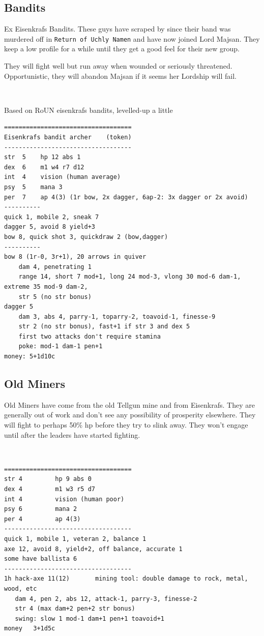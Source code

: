 

\begin{samepage}
\subsection*{Bandits}
Ex Eisenkrafs Bandits. These guys have scraped by since their band was murdered off in \texttt{Return of Uchly Namen} and have now joined Lord Majsan. They keep a low profile for a while until they get a good feel for their new group.

They will fight well but run away when wounded or seriously threatened. Opportunistic, they will abandon Majsan if it seems her Lordship will fail.

\

\noindent
Based on RoUN eisenkrafs bandits, levelled-up a little
\small \begin{verbatim}
===================================
Eisenkrafs bandit archer    (token)
-----------------------------------
str  5    hp 12 abs 1
dex  6    m1 w4 r7 d12
int  4    vision (human average)
psy  5    mana 3
per  7    ap 4(3) (1r bow, 2x dagger, 6ap-2: 3x dagger or 2x avoid)
----------
quick 1, mobile 2, sneak 7
dagger 5, avoid 8 yield+3
bow 8, quick shot 3, quickdraw 2 (bow,dagger)
----------
bow 8 (1r-0, 3r+1), 20 arrows in quiver
    dam 4, penetrating 1
    range 14, short 7 mod+1, long 24 mod-3, vlong 30 mod-6 dam-1, extreme 35 mod-9 dam-2,
    str 5 (no str bonus)
dagger 5
    dam 3, abs 4, parry-1, toparry-2, toavoid-1, finesse-9
    str 2 (no str bonus), fast+1 if str 3 and dex 5
    first two attacks don't require stamina
    poke: mod-1 dam-1 pen+1
money: 5+1d10c
\end{verbatim} \normalsize
\end{samepage}



\begin{samepage}
\subsection*{Old Miners}
Old Miners have come from the old Tellgun mine and from Eisenkrafs. They are generally out of work and don't see any possibility of prosperity elsewhere. They will fight to perhaps 50\% hp before they try to slink away. They won't engage until after the leaders have started fighting.

\

\small \begin{verbatim}
===================================
str 4         hp 9 abs 0
dex 4         m1 w3 r5 d7
int 4         vision (human poor)
psy 6         mana 2
per 4         ap 4(3)
-----------------------------------
quick 1, mobile 1, veteran 2, balance 1
axe 12, avoid 8, yield+2, off balance, accurate 1
some have ballista 6
-----------------------------------
1h hack-axe 11(12)       mining tool: double damage to rock, metal, wood, etc
   dam 4, pen 2, abs 12, attack-1, parry-3, finesse-2
   str 4 (max dam+2 pen+2 str bonus)
   swing: slow 1 mod-1 dam+1 pen+1 toavoid+1
money	3+1d5c
\end{verbatim} \normalsize
\end{samepage}


